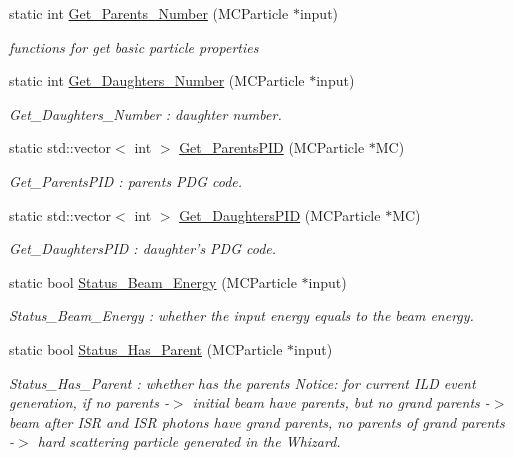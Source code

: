 \begin{DoxyCompactItemize}
static int \hyperlink{classToolSet_1_1CMC_a67ab1d51b7fd0f98cfa19be5381e961a}{Get\_\-Parents\_\-Number} (MCParticle $\ast$input)
\begin{DoxyCompactList}\small\item\em functions for get basic particle properties \item\end{DoxyCompactList}\item 
static int \hyperlink{classToolSet_1_1CMC_a44a3b5e5df7effa4ed170151cd63b706}{Get\_\-Daughters\_\-Number} (MCParticle $\ast$input)
\begin{DoxyCompactList}\small\item\em Get\_\-Daughters\_\-Number : daughter number. \item\end{DoxyCompactList}\item 
static std::vector$<$ int $>$ \hyperlink{classToolSet_1_1CMC_aa98186321fc75d5f476bc97511e1d91b}{Get\_\-ParentsPID} (MCParticle $\ast$MC)
\begin{DoxyCompactList}\small\item\em Get\_\-ParentsPID : parents PDG code. \item\end{DoxyCompactList}\item 
static std::vector$<$ int $>$ \hyperlink{classToolSet_1_1CMC_ae0aeb5054574c5c8ffd3f24e86d662a6}{Get\_\-DaughtersPID} (MCParticle $\ast$MC)
\begin{DoxyCompactList}\small\item\em Get\_\-DaughtersPID : daughter's PDG code. \item\end{DoxyCompactList}\item 
static bool \hyperlink{classToolSet_1_1CMC_a3ebc24c0c160ba37054b294059f09d96}{Status\_\-Beam\_\-Energy} (MCParticle $\ast$input)
\begin{DoxyCompactList}\small\item\em Status\_\-Beam\_\-Energy : whether the input energy equals to the beam energy. \item\end{DoxyCompactList}\item 
static bool \hyperlink{classToolSet_1_1CMC_acd1cf4b7527b2e2bd194ad688b29b132}{Status\_\-Has\_\-Parent} (MCParticle $\ast$input)
\begin{DoxyCompactList}\small\item\em Status\_\-Has\_\-Parent : whether has the parents Notice: for current ILD event generation, if no parents -\/$>$ initial beam have parents, but no grand parents -\/$>$ beam after ISR and ISR photons have grand parents, no parents of grand parents -\/$>$ hard scattering particle generated in the Whizard. \item\end{DoxyCompactList}\item 

\end{DoxyCompactItemize}
